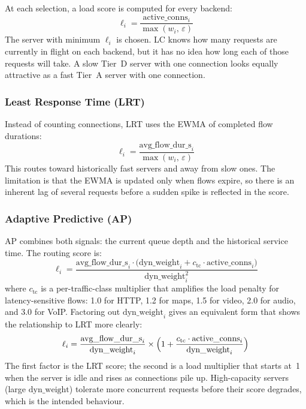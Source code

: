 \documentclass[10pt,a4paper,twocolumn]{article}
\numberwithin{figure}{section}
\numberwithin{table}{section}
\numberwithin{equation}{section}
\begin{document}
At each selection, a load score is computed for every backend:
\begin{equation}
  \ell_i = \frac{\text{active\_conns}_i}{\max(w_i,\,\varepsilon)}
  \label{eq:lc}
\end{equation}
The server with minimum $\ell_i$ is chosen. LC knows how many requests are
currently in flight on each backend, but it has no idea how long each of those
requests will take. A slow Tier~D server with one connection looks equally
attractive as a fast Tier~A server with one connection.

\subsubsection{Least Response Time (LRT)}

Instead of counting connections, LRT uses the EWMA of completed flow durations:
\begin{equation}
  \ell_i = \frac{\text{avg\_flow\_dur\_s}_i}{\max(w_i,\,\varepsilon)}
  \label{eq:lrt}
\end{equation}
This routes toward historically fast servers and away from slow ones. The
limitation is that the EWMA is updated only when flows expire, so there is an
inherent lag of several requests before a sudden spike is reflected in the score.

\subsubsection{Adaptive Predictive (AP)}
\label{sec:ap}

AP combines both signals: the current queue depth and the historical service
time. The routing score is:
\begin{equation}
  \ell_i = \frac{\text{avg\_flow\_dur\_s}_i \cdot
                 \bigl(\text{dyn\_weight}_i
                       + c_{\mathrm{tc}} \cdot \text{active\_conns}_i\bigr)}
                {\text{dyn\_weight}_i^{2}}
  \label{eq:ap}
\end{equation}
where $c_{\mathrm{tc}}$ is a per-traffic-class multiplier that amplifies the
load penalty for latency-sensitive flows: 1.0 for HTTP, 1.2 for maps, 1.5
for video, 2.0 for audio, and 3.0 for VoIP. Factoring out
$\text{dyn\_weight}_i$ gives an equivalent form that shows the relationship to
LRT more clearly:
\[
  \ell_i = \frac{\text{avg\_flow\_dur\_s}_i}{\text{dyn\_weight}_i}
           \times \Bigl(1 + \frac{c_{\mathrm{tc}} \cdot \text{active\_conns}_i}
                              {\text{dyn\_weight}_i}\Bigr)
\]
The first factor is the LRT score; the second is a load multiplier that starts
at~1 when the server is idle and rises as connections pile up. High-capacity
servers (large $\text{dyn\_weight}$) tolerate more concurrent requests before
their score degrades, which is the intended behaviour.
\end{document}
